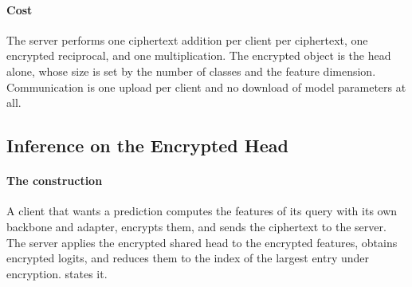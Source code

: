 
\paragraph{Cost} The server performs one ciphertext addition per client per
ciphertext, one encrypted reciprocal, and one multiplication. The encrypted object
is the head alone, whose size is set by the number of classes and the feature
dimension. Communication is one upload per
client and no download of model parameters at all.

\subsection{Inference on the Encrypted Head}
\label{sec:serving}

\tronly{}

\paragraph{The construction} A client that wants a prediction computes the
features of its query with its own backbone and adapter, encrypts them, and sends
the ciphertext to the server. The server applies the encrypted shared
head to the encrypted features, obtains encrypted logits, and reduces them to the
index of the largest entry under encryption.
 states it.

